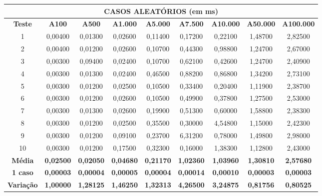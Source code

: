 \documentclass[a4paper, 12pt]{article}
\begin{document}
\begin{tabular}{ccccccccc}

                                                               \multicolumn{ 9}{c}{{\bf CASOS ALEATÓRIOS (em ms)}} \\
\hline
{\bf Teste} & {\bf A100} & {\bf A500} & {\bf A1.000} & {\bf A5.000} & {\bf A7.500} & {\bf A10.000} & {\bf A50.000} & {\bf A100.000} \\
\hline
         1 &    0,00400 &    0,01300 &    0,02600 &    0,11400 &    0,17200 &    0,22100 &    1,48700 &    2,82500 \\
\hline
         2 &    0,00400 &    0,01200 &    0,02600 &    0,10700 &    0,44300 &    0,98800 &    1,24700 &    2,67000 \\
\hline
         3 &    0,00300 &    0,09400 &    0,02400 &    0,10700 &    0,62100 &    0,42600 &    1,24700 &    2,40900 \\
\hline
         4 &    0,00300 &    0,01300 &    0,02400 &    0,46500 &    0,88200 &    0,86800 &    1,34200 &    2,73100 \\
\hline
         5 &    0,00300 &    0,01200 &    0,02500 &    0,10500 &    0,33400 &    0,20400 &    1,11900 &    2,38700 \\
\hline
         6 &    0,00300 &    0,01200 &    0,02600 &    0,10500 &    0,49900 &    0,37800 &    1,27500 &    2,53000 \\
\hline
         7 &    0,00300 &    0,01300 &    0,02600 &    0,19900 &    0,51300 &    0,60000 &    1,58800 &    2,38300 \\
\hline
         8 &    0,00300 &    0,01200 &    0,02500 &    0,35500 &    0,30000 &    4,54800 &    1,15000 &    2,42300 \\
\hline
         9 &    0,00300 &    0,01200 &    0,09100 &    0,23700 &    6,31200 &    0,78000 &    1,49800 &    2,98000 \\
\hline
        10 &    0,00300 &    0,01200 &    0,17500 &    0,32300 &    0,16000 &    1,38300 &    1,12800 &    2,43000 \\
\hline
{\bf Média} & {\bf 0,02500} & {\bf 0,02050} & {\bf 0,04680} & {\bf 0,21170} & {\bf 1,02360} & {\bf 1,03960} & {\bf 1,30810} & {\bf 2,57680} \\
\hline
{\bf 1 caso} & {\bf 0,00003} & {\bf 0,00004} & {\bf 0,00005} & {\bf 0,00004} & {\bf 0,00014} & {\bf 0,00010} & {\bf 0,00003} & {\bf 0,00003} \\
\hline
{\bf Variação} & {\bf 1,00000} & {\bf 1,28125} & {\bf 1,46250} & {\bf 1,32313} & {\bf 4,26500} & {\bf 3,24875} & {\bf 0,81756} & {\bf 0,80525} \\
\hline
\end{tabular}  
\vspace{0.3cm}
\end{document}
